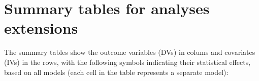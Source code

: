 \documentclass[12pt]{article}
\begin{document}
\section{Summary tables for analyses extensions}


The summary tables show the outcome variables (DVs) in colums and covariates (IVs) in the rows, with the following symbols indicating their statistical effects, based on all models (each cell in the table represents a separate model):







\end{document}
